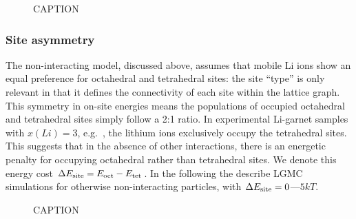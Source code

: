\documentclass[aps,prb,twocolumn,superscriptaddress,reprint]{revtex4-1}
\begin{document}
\begin{figure}[tb]
  \centering
    \caption{\label{fig:nearest_neighbour_sketch_alt_layout}CAPTION}
\end{figure}

\subsubsection{Site asymmetry}
The non-interacting model, discussed above, assumes that mobile Li ions show an equal preference for octahedral and tetrahedral sites: the site ``type'' is only relevant in that it defines the connectivity  of each site within the lattice graph. 
This symmetry in on-site energies means the populations of occupied octahedral and tetrahedral sites simply follow a 2:1 ratio. 
In experimental Li-garnet samples with $x(Li)=3$, e.g.\ , the lithium ions exclusively occupy the tetrahedral sites\cite{OCallaghanEtAl_ChemMater2006}. 
This suggests that in the absence of other interactions, there is an energetic penalty for occupying octahedral rather than tetrahedral sites. 
We denote this energy cost $\Delta E_{\mathrm{site}} = E_{\mathrm{oct}} - E_{\mathrm{tet}}$. 
In the following the describe LGMC simulations for otherwise non-interacting particles, with $\Delta E_{\mathrm{site}}=0$---$5kT$.

\begin{figure}[tb]
  \centering
    \caption{\label{fig:site_assymetry_sketch}CAPTION}
\end{figure}
\end{document}
